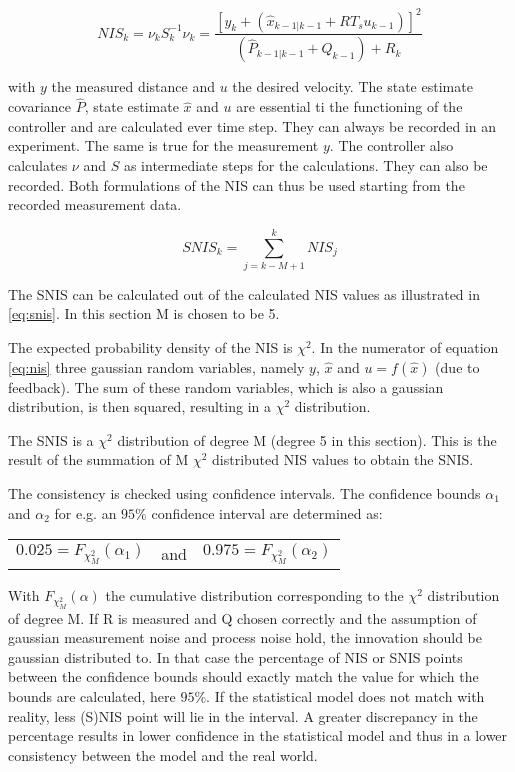 \documentclass[a4paper]{article}
\newcommand{\newpar}{\vspace{.3cm}\noindent}
\begin{document}
\begin{equation}
    NIS_{k}=\nu_{k} S_{k}^{-1} \nu_{k} = \frac{\left[y_{k}+\left( \hat{x}_{k-1|k-1}+R T_{s} u_{k-1}\right)\right]^{2}}{\left( \hat{P}_{k-1|k-1}+Q_{k-1}\right)+R_{k}}
    \label{eq:nis}
\end{equation}

\newpar
with \(y\) the measured distance and \(u\) the desired velocity. The state estimate covariance $\hat{P}$, state estimate $\hat{x}$ and $u$ are essential ti the functioning of the controller and are calculated ever time step. They can always be recorded in an experiment. The same is true for the measurement $y$. The controller also calculates $\nu$ and $S$ as intermediate steps for the calculations. They can also be recorded. Both formulations of the NIS can thus be used starting from the recorded measurement data.

\begin{equation}
    SNIS_{k}=\sum_{j=k-M+1}^{k} NIS_{j}
    \label{eq:snis}
\end{equation}

\newpar
The SNIS can be calculated out of the calculated NIS values as illustrated in \autoref{eq:snis}. In this section M is chosen to be 5.

\newpar
The expected probability density of the NIS is $\chi^2$. In the numerator of equation \autoref{eq:nis} three gaussian random variables, namely $y$, $\hat{x}$ and $u=f(\hat{x})$ (due to feedback). The sum of these random variables, which is also a gaussian distribution, is then squared, resulting in a $\chi^2$ distribution.

\newpar
The SNIS is a $\chi^2$ distribution of degree M (degree 5 in this section). This is the result of the summation of M $\chi^2$ distributed NIS values to obtain the SNIS.

\newpar
The consistency is checked using confidence intervals. The confidence bounds $\alpha_{1}$ and $\alpha_{2}$ for e.g. an $95\%$ confidence interval are determined as:

\begin{center}
    \begin{tabular}{ccc}
        \(0.025 = F_{\chi^2_{M}}(\alpha_{1})\) &   and    & \(0.975 = F_{\chi^2_{M}}(\alpha_{2})\)
    \end{tabular}
\end{center}

\newpar
With \(F_{\chi^2_{M}}(\alpha)\) the cumulative distribution corresponding to the $\chi^2$ distribution of degree M. 
If R is measured and Q chosen correctly and the assumption of gaussian measurement noise and process noise hold, the innovation should be gaussian distributed to. In that case the percentage of NIS or SNIS points between the confidence bounds should exactly match the value for which the bounds are calculated, here $95\%$. If the statistical model does not match with reality, less (S)NIS point will lie in the interval. A greater discrepancy in the percentage results in lower confidence in the statistical model and thus in a lower consistency between the model and the real world.
    
\end{document}
